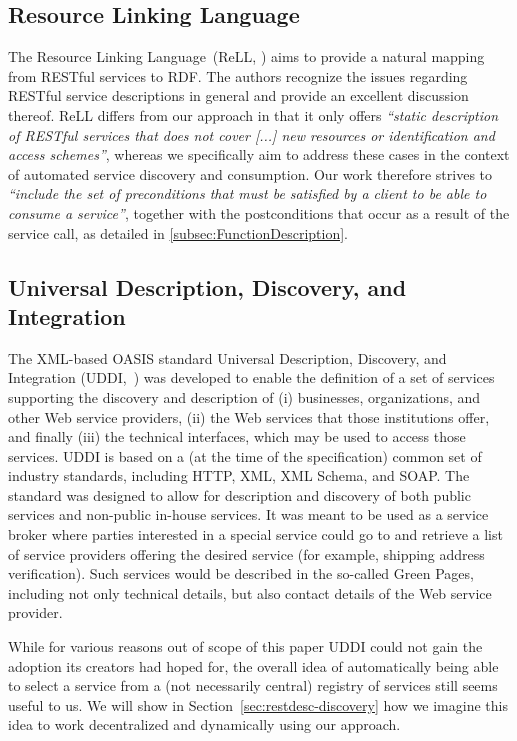 \documentclass[runningheads,a4paper, twocolumn]{llncs}
\begin{document}
\subsection{Resource Linking Language}
The Resource Linking Language~(ReLL, \cite{Alarcon:2010p5515}) aims to provide a natural mapping from RESTful services to RDF. The authors recognize the issues regarding RESTful service descriptions in general and provide an excellent discussion thereof. ReLL differs from our approach in that it only offers \emph{``static description of RESTful services that does not cover [...] new resources or identification and access schemes''}, whereas we specifically aim to address these cases in the context of automated service discovery and consumption. Our work therefore strives to \emph{``include the set of preconditions that must be satisfied by a client to be able to consume a service''}, together with the postconditions that occur as a result of the service call, as detailed in \autoref{subsec:FunctionDescription}.

\subsection{Universal Description, Discovery, and Integration} \label{sec:uddi}
The XML-based OASIS standard Universal Description, Discovery, and Integration (UDDI,~\cite{UDDI}) was developed to enable the definition of a set of services supporting the discovery and description of (i) businesses, organizations, and other Web service providers, (ii) the Web services that those institutions offer, and finally (iii) the technical interfaces, which may be used to access those services. UDDI is based on a (at the time of the specification) common set of industry standards, including HTTP, XML, XML Schema, and SOAP. The standard was designed to allow for description and discovery of both public services and non-public in-house services. It was meant to be used as a service broker where parties interested in a special service could go to and retrieve a list of service providers offering the desired service (for example, shipping address verification). Such services would be described in the so-called Green Pages, including not only technical details, but also contact details of the Web service provider.

While for various reasons out of scope of this paper UDDI could not gain the adoption its creators had hoped for, the overall idea of automatically being able to select a service from a (not necessarily central) registry of services still seems useful to us. We will show in Section~\ref{sec:restdesc-discovery} how we imagine this idea to work decentralized and dynamically using our approach.
\end{document}
